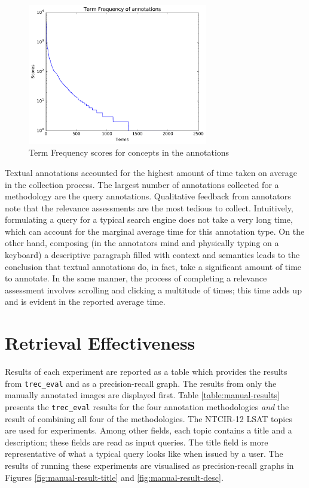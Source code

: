 \begin{figure}[b]
    \centering
    \includegraphics[width=0.7\textwidth]{graphs/tf-scores}
    \caption{Term Frequency scores for concepts in the annotations}
    \label{fig:tf-scores}
\end{figure}

Textual annotations accounted for the highest amount of time taken on average in the collection process. The largest number of annotations collected for a methodology are the query annotations. Qualitative feedback from annotators note that the relevance assessments are the most tedious to collect. Intuitively, formulating a query for a typical search engine does not take a very long time, which can account for the marginal average time for this annotation type. On the other hand, composing (in the annotators mind and physically typing on a keyboard) a descriptive paragraph filled with context and semantics leads to the conclusion that textual annotations do, in fact, take a significant amount of time to annotate. In the same manner, the process of completing a relevance assessment involves scrolling and clicking a multitude of times; this time adds up and is evident in the reported average time.

\FloatBarrier
\section{Retrieval Effectiveness}

Results of each experiment are reported as a table which provides the results from \verb|trec_eval| and as a precision-recall graph. The results from only the manually annotated images are displayed first. Table \ref{table:manual-results} presents the \verb|trec_eval| results for the four annotation methodologies \textit{and} the result of combining all four of the methodologies. The  NTCIR-12 LSAT topics are used for experiments. Among other fields, each topic contains a title and a description; these fields are read as input queries. The title field is more representative of what a typical query looks like when issued by a user. The results of running these experiments are visualised as precision-recall graphs in Figures \ref{fig:manual-result-title} and \ref{fig:manual-result-desc}.


